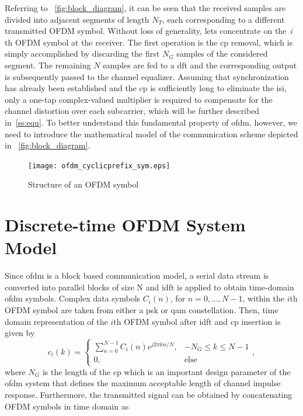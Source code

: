 Referring to ~\cref{fig:block_diagram}, it can be seen that the received samples are divided into adjacent segments of length $N_T$, each corresponding to a different transmitted OFDM symbol. Without loss of generality, lets concentrate on the~$i$th OFDM symbol at the receiver. The first operation is the \gls{cp} removal, which is simply accomplished by discarding the first $N_G$ samples of the considered segment. The remaining $N$ samples are fed to a \gls{dft} and the corresponding output is subsequently passed to the channel equalizer. Assuming that synchronization has already been established and the \gls{cp} is sufficiently long to eliminate the \gls{isi}, only a one-tap complex-valued multiplier is required to compensate for the channel distortion over each subcarrier, which will be further described in~\cref{ss:equ}. To better understand this fundamental property of \gls{ofdm}, however, we need to introduce the mathematical model of the communication scheme depicted in ~\cref{fig:block_diagram}.
%
\begin{figure}[thb]
\centering
\texttt{[image: ofdm\_cyclicprefix\_sym.eps]}
\caption{Structure of an OFDM symbol\label{fig:cp}}
\end{figure}

\section{Discrete-time OFDM System Model}\label{sec:discmod}

Since \gls{ofdm} is a block based communication model, a serial data stream is converted into parallel blocks of size N and \gls{idft} is applied to obtain time-domain \gls{ofdm} symbols. 
Complex data symbols $C_i(n)$, for $n=0,\ldots,N-1$, within the $i$th OFDM symbol are taken from either a \gls{psk} or \gls{qam} constellation. Then, time domain representation of the $i$th OFDM symbol after \gls{idft} and \gls{cp} insertion is given by
%
\begin{equation}\label{IDFT}
c_i(k)= 
\begin{cases}
   \sum_{n=0}^{N-1}{C_i(n)e^{j2\pi kn/N}},& -N_G \leq k \leq N-1\\
   0,&\text{else}
\end{cases},
\end{equation}
%
where $N_G$ is the length of the \gls{cp} which is an important design parameter of the \gls{ofdm} system that defines the maximum acceptable length of {channel impulse response}. Furthermore, the transmitted signal can be obtained by concatenating OFDM symbols in time domain as

